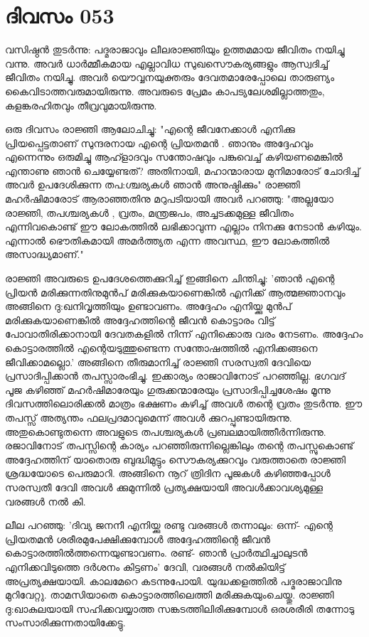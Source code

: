  
\section{ദിവസം 053}


വസിഷ്ഠന്‍ തുടര്‍ന്നു: പദ്മരാജാവും ലീലരാജ്ഞിയും ഉത്തമമായ ജീവിതം നയിച്ചു വന്നു. അവര്‍ ധാര്‍മ്മീകമായ എല്ലാവിധ സുഖസൌകര്യങ്ങളും ആസ്വദിച്ച്‌ ജീവിതം നയിച്ചു. അവര്‍ യൌവ്വനയുക്തരും ദേവതമാരേപ്പോലെ താരുണ്യം കൈവിടാത്തവരുമായിരുന്നു. അവരുടെ പ്രേമം കാപട്യലേശമില്ലാത്തതും, കളങ്കരഹിതവും തീവ്രവുമായിരുന്നു. 

ഒരു ദിവസം രാജ്ഞി ആലോചിച്ചു: "എന്റെ ജീവനേക്കാള്‍ എനിക്കു പ്രിയപ്പെട്ടതാണ്‌ സുന്ദരനായ എന്റെ പ്രിയതമന്‍ . ഞാനും അദ്ദേഹവും എന്നെന്നും ഒരുമിച്ചു  ആഹ്ളാദവും    സന്തോഷവും പങ്കുവെച്ച്‌ കഴിയണമെങ്കില്‍ എന്താണു ഞാന്‍ ചെയ്യേണ്ടത്‌? അതിനായി, മഹാന്മാരായ മുനിമാരോട്‌ ചോദിച്ച്‌ അവര്‍ ഉപദേശിക്കുന്ന തപ:ശ്ചര്യകള്‍ ഞാന്‍ അനുഷ്ഠിക്കും" രാജ്ഞി മഹര്‍ഷിമാരോട്‌ ആരാഞ്ഞതിനു മറുപടിയായി അവര്‍ പറഞ്ഞു: "അല്ലയോ രാജ്ഞി, തപശ്ചര്യകള്‍ , വ്രതം, മന്ത്രജപം, അച്ചടക്കമുള്ള ജീവിതം എന്നിവകൊണ്ട്‌ ഈ ലോകത്തില്‍ ലഭിക്കാവുന്ന എല്ലാം നിനക്കു നേടാന്‍ കഴിയും. എന്നാല്‍ ഭൌതികമായി അമര്‍ത്ത്യത എന്ന അവസ്ഥ, ഈ ലോകത്തില്‍ അസാദ്ധ്യമാണ്‌."

രാജ്ഞി അവരുടെ ഉപദേശത്തെക്കുറിച്ച്‌ ഇങ്ങിനെ ചിന്തിച്ചു: 'ഞാന്‍ എന്റെ പ്രിയന്‍ മരിക്കുന്നതിനുമുന്‍പ്‌ മരിക്കുകയാണെങ്കില്‍ എനിക്ക്‌ ആത്മജ്ഞാനവും അങ്ങിനെ ദു:ഖനിവൃത്തിയും ഉണ്ടാവണം. അദ്ദേഹം എനിയ്ക്കു മുന്‍പ്‌ മരിക്കുകയാണെങ്കില്‍ അദ്ദേഹത്തിന്റെ ജീവന്‍ കൊട്ടാരം വിട്ട്‌ പോവാതിരിക്കാനായി ദേവതകളില്‍ നിന്ന് എനിക്കൊരു വരം നേടണം. അദ്ദേഹം കൊട്ടാരത്തില്‍ എന്റെയടുത്തുണ്ടെന്ന സന്തോഷത്തില്‍ എനിക്കങ്ങനെ ജീവിക്കാമല്ലൊ.' അങ്ങിനെ തീരുമാനിച്ച്‌ രാജ്ഞി സരസ്വതി ദേവിയെ പ്രസാദിപ്പിക്കാന്‍ തപസ്സാരംഭിച്ചു. ഇക്കാര്യം രാജാവിനോട്‌ പറഞ്ഞില്ല. ഭഗവദ്‌ പൂജ കഴിഞ്ഞ്‌ മഹര്‍ഷിമാരേയും ഗുരുക്കന്മാരേയും പ്രസാദിപ്പിച്ചശേഷം മൂന്നു ദിവസത്തിലൊരിക്കല്‍ മാത്രം ഭക്ഷണം കഴിച്ച്‌ അവള്‍ തന്റെ വ്രതം തുടര്‍ന്നു. ഈ തപസ്സ്‌ അത്യന്തം ഫലപ്രദമാവുമെന്ന് അവള്‍ ക്കുറപ്പുണ്ടായിരുന്നു. അതുകൊണ്ടുതന്നെ അവളുടെ തപശ്ചര്യകള്‍ പ്രബലമായിത്തീര്‍ന്നിരുന്നു. രജാവിനോട്‌ തപസ്സിന്റെ കാര്യം പറഞ്ഞിരുന്നില്ലെങ്കിലും തന്റെ തപസ്സുകൊണ്ട്‌ അദ്ദേഹത്തിന്‌ യാതൊരു ബുദ്ധിമുട്ടും സൌകര്യക്കുറവും വരുത്താതെ രാജ്ഞി ശ്രദ്ധയോടെ പെരുമാറി. അങ്ങിനെ നൂറ്‌ ത്രിദിന പൂജകള്‍ കഴിഞ്ഞപ്പോള്‍ സരസ്വതീ ദേവി അവള്‍ ക്കുമുന്നില്‍ പ്രത്യക്ഷയായി അവള്‍ക്കാവശ്യമുള്ള വരങ്ങള്‍ നല്‍ കി.

ലീല പറഞ്ഞു: 'ദിവ്യ ജനനീ എനിയ്ക്കു രണ്ടു വരങ്ങള്‍ തന്നാലും: ഒന്ന്- എന്റെ പ്രിയതമന്‍ ശരീരമുപേക്ഷിക്കുമ്പോള്‍ അദ്ദേഹത്തിന്റെ ജീവന്‍ കൊട്ടാരത്തില്‍ത്തന്നെയുണ്ടാവണം. രണ്ട്‌- ഞാന്‍ പ്രാര്‍ത്ഥിച്ചാലുടന്‍ എനിക്കവിടുത്തെ ദര്‍ശനം കിട്ടണം' ദേവി, വരങ്ങള്‍ നല്‍കിയിട്ട് അപ്രത്യക്ഷയായി. കാലമേറെ കടന്നുപോയി. യുദ്ധക്കളത്തില്‍ പദ്മരാജാവിനു മുറിവേറ്റു. താമസിയാതെ കൊട്ടാരത്തിലെത്തി മരിക്കുകയുംചെയ്തു. രാജ്ഞി ദു:ഖാകുലയായി സഹിക്കവയ്യാത്ത സങ്കടത്തിലിരിക്കുമ്പോള്‍ ഒരശരീരി തന്നോടു സംസാരിക്കുന്നതായിക്കേട്ടു.

